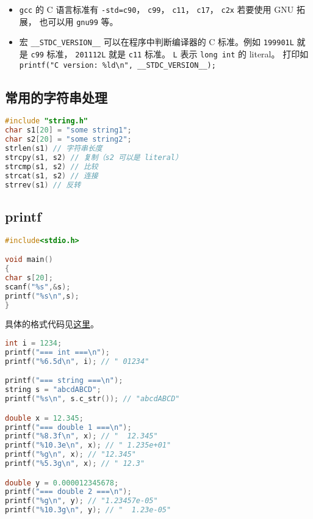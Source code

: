 

\begin{issues}
\issueDraft
\end{issues}

\begin{itemize}
\item \verb`gcc` 的 C 语言标准有 \verb`-std=c90`， \verb`c99`， \verb`c11`， \verb`c17`， \verb`c2x` 若要使用 GNU 拓展， 也可以用 \verb`gnu99` 等。
\item 宏 \verb`__STDC_VERSION__` 可以在程序中判断编译器的 C 标准。例如 \verb`199901L` 就是 \verb`c99` 标准， \verb`201112L` 就是 \verb`c11` 标准。 \verb`L` 表示 \verb`long int` 的 literal。 打印如 \verb`printf("C version: %ld\n", __STDC_VERSION__);`
\end{itemize}


\subsection{常用的字符串处理}
\begin{lstlisting}[language=cpp]
#include "string.h"
char s1[20] = "some string1";
char s2[20] = "some string2";
strlen(s1) // 字符串长度
strcpy(s1, s2) // 复制（s2 可以是 literal）
strcmp(s1, s2) // 比较
strcat(s1, s2) // 连接
strrev(s1) // 反转
\end{lstlisting}

\subsection{printf}
\begin{lstlisting}[language=cpp]
#include<stdio.h>

void main()
{
char s[20];
scanf("%s",&s);
printf("%s\n",s);
}
\end{lstlisting}
具体的格式代码见\href{https://www.tutorialspoint.com/c_standard_library/c_function_printf.htm}{这里}。

\begin{lstlisting}[language=cpp]
int i = 1234;
printf("=== int ===\n");
printf("%6.5d\n", i); // " 01234"

printf("=== string ===\n");
string s = "abcdABCD";
printf("%s\n", s.c_str()); // "abcdABCD"

double x = 12.345;
printf("=== double 1 ===\n");
printf("%8.3f\n", x); // "  12.345"
printf("%10.3e\n", x); // " 1.235e+01"
printf("%g\n", x); // "12.345"
printf("%5.3g\n", x); // " 12.3"

double y = 0.000012345678;
printf("=== double 2 ===\n");
printf("%g\n", y); // "1.23457e-05"
printf("%10.3g\n", y); // "  1.23e-05"
\end{lstlisting}

